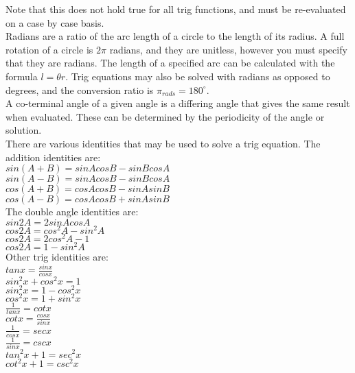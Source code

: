 \documentclass{article}
\begin{document}
Note that this does not hold true for all trig functions, and must be re-evaluated on a case by case basis. \\

Radians are a ratio of the arc length of a circle to the length of its radius. A full rotation of a circle is $2\pi$ radians, and they are unitless, however you must specify that they are radians. The length of a specified arc can be calculated with the formula $l=\theta r$. Trig equations may also be solved with radians as opposed to degrees, and the conversion ratio is $\pi _{rads} = 180^{\circ}$. \\

A co-terminal angle of a given angle is a differing angle that gives the same result when evaluated. These can be determined by the periodicity of the angle or solution. \\

There are various identities that may be used to solve a trig equation. The addition identities are: \\

$sin(A + B) = sinAcosB - sinBcosA$ \\
$sin(A-B) = sinAcosB - sinBcosA$ \\
$cos(A + B) = cosAcosB - sinAsinB$ \\
$cos(A - B) = cosAcosB + sinAsinB$ \\

The double angle identities are: \\

$sin2A = 2sinAcosA$ \\
$cos2A=cos^2A-sin^2A$ \\
$cos2A = 2cos^2A - 1$ \\
$cos2A = 1 - sin^2A$ \\

Other trig identities are: \\

$tanx=\frac{sinx}{cosx}$ \\
$sin^2x + cos^2x = 1$ \\
$sin^2x = 1-cos^2x$ \\
$cos^2x = 1+sin^2x$ \\
$\frac{1}{tanx}=cotx$ \\
$cotx=\frac{cosx}{sinx}$ \\
$\frac{1}{cosx}=secx$ \\
$\frac{1}{sinx}=cscx$ \\
$tan^2x+1=sec^2x$ \\
$cot^2x+1=csc^2x$ \\
\end{document}

